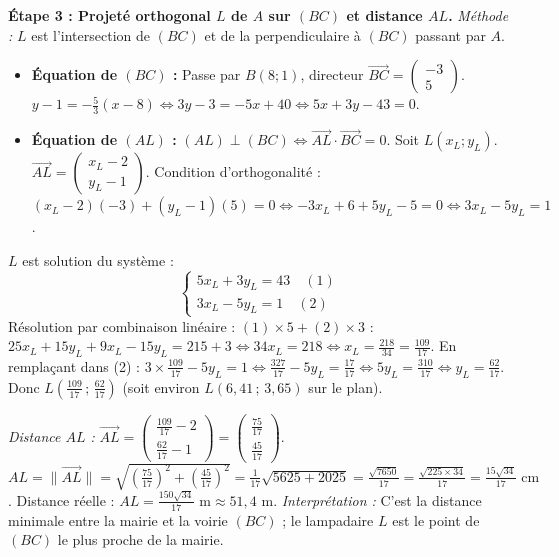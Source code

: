 \documentclass[11pt]{article}
\begin{document}
\begin{exoresolu}
\textbf{Étape 3 : Projeté orthogonal $L$ de $A$ sur $(BC)$ et distance $AL$.}
\emph{Méthode :} $L$ est l'intersection de $(BC)$ et de la perpendiculaire à $(BC)$ passant par $A$.
\begin{itemize}
    \item \textbf{Équation de $(BC)$ :} Passe par $B(8;1)$, directeur $\vec{BC}=\begin{pmatrix}-3\\5\end{pmatrix}$.
    $y - 1 = -\frac{5}{3}(x - 8) \iff 3y - 3 = -5x + 40 \iff \boxed{5x + 3y - 43 = 0}$.
    \item \textbf{Équation de $(AL)$ :} $(AL) \perp (BC) \iff \vec{AL} \cdot \vec{BC} = 0$.
    Soit $L(x_L;y_L)$. $\vec{AL} = \begin{pmatrix} x_L-2 \\ y_L-1 \end{pmatrix}$.
    Condition d'orthogonalité : $(x_L-2)(-3) + (y_L-1)(5) = 0 \iff -3x_L + 6 + 5y_L - 5 = 0 \iff \boxed{3x_L - 5y_L = 1}$.
\end{itemize}
$L$ est solution du système :
\[
\begin{cases}
5x_L + 3y_L = 43 \quad (1)\\
3x_L - 5y_L = 1 \quad (2)
\end{cases}
\]
Résolution par combinaison linéaire : $(1)\times 5 + (2)\times 3$ :
$25x_L + 15y_L + 9x_L - 15y_L = 215 + 3 \iff 34x_L = 218 \iff x_L = \frac{218}{34} = \frac{109}{17}$.
En remplaçant dans (2) : $3\times\frac{109}{17} - 5y_L = 1 \iff \frac{327}{17} - 5y_L = \frac{17}{17} \iff 5y_L = \frac{310}{17} \iff y_L = \frac{62}{17}$.
Donc \textbf{$L\left(\frac{109}{17}\,;\,\frac{62}{17}\right)$} (soit environ $L(6,41\,;\,3,65)$ sur le plan).

\emph{Distance $AL$ :}
$\vec{AL} = \begin{pmatrix} \frac{109}{17}-2 \\ \frac{62}{17}-1 \end{pmatrix} = \begin{pmatrix} \frac{75}{17} \\ \frac{45}{17} \end{pmatrix}$.
$AL = \|\vec{AL}\| = \sqrt{\left(\frac{75}{17}\right)^2 + \left(\frac{45}{17}\right)^2} = \frac{1}{17}\sqrt{5625 + 2025} = \frac{\sqrt{7650}}{17} = \frac{\sqrt{225\times 34}}{17} = \frac{15\sqrt{34}}{17} \text{ cm}$.
Distance réelle : $\boxed{AL = \frac{150\sqrt{34}}{17} \text{ m} \approx 51,4 \text{ m}}$.
\textit{Interprétation :} C'est la distance minimale entre la mairie et la voirie $(BC)$ ; le lampadaire $L$ est le point de $(BC)$ le plus proche de la mairie.


\end{exoresolu}
\end{document}
